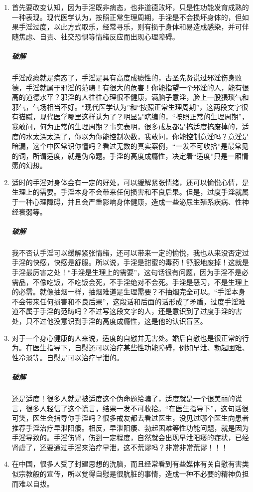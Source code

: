 \begin{enumerate}
    \item 首先要改变认知，因为手淫既非病态，也非道德败坏，只是性功能发育成熟的一种表现。现代医学认为，按照正常生理周期，手淫是不会损坏身体的，但如果手淫过度，以此方式取乐，经常寻乐，则有损于身体和易造成感染，并可伴随焦虑、自责、社交恐惧等情绪反应而出现心理障碍。
    \subparagraph{破解} 手淫成瘾就是病态了，手淫是具有高度成瘾性的，古圣先贤说过邪淫伤身败德，手淫就属于邪淫的范畴！有很大的危害！你能指望一个邪淫的人，能有很高的道德水平？邪淫的人往往心理很不健康，满脑子意淫，脸上一股猥琐气和邪气，气场相当不好。“现代医学认为”和“按照正常生理周期”，这两段文字很有猫腻，现代医学哪里这样认为了？明显是瞎编的，“按照正常的生理周期”，我敢问，何为正常的生理周期？事实表明，很多戒友都是搞适度搞废掉的，适度的水太深太深了，你以为你能控制次数，我敢问，你能控制意淫吗？意淫是暗漏，这个中医常识你懂吗？看过无数的真实案例，“一发不可收拾”是最常见的词，所谓适度，就是伪命题。手淫的高度成瘾性，决定着“适度”只是一厢情愿的幻想。
    \item 适时的手淫对身体会有一定的好处，可以缓解紧张情绪，还可以愉悦心情，是生理上的需要。手淫本身不会带来任何损害和不良后果。但是，过度手淫就属于一种心理障碍，并且会严重影响身体健康，造成一些泌尿生殖系疾病、性神经衰弱等。
    \subparagraph{破解} 我不否认手淫可以缓解紧张情绪，还可以带来一定的愉悦，我也从来没否定过手淫的快感，快感是舒服。所以说，手淫是甜蜜的毒药！舒服地废掉！这就是手淫最厉害之处！“手淫是生理上的需要”，这句话很有问题，因为手淫不是必需品，不像吃饭，不吃饭会死，不手淫绝对不会死。手淫是恶习，不是生理上的必需。就像抽烟一样，抽烟难道是生理需要？不抽烟完全可以。“手淫本身不会带来任何损害和不良后果”，这段话和后面的话形成了矛盾，过度手淫难道不属于手淫的范畴吗？不过写这段文字的人，还是意识到了过度手淫的害处，只不过他没意识到手淫的高度成瘾性，这是他的认识盲区。
    \item 对于一个身心健康的人来说，适度的自慰并无害处。婚后自慰也是很正常的行为。在医生指导下，自慰还可以治疗某些性功能障碍，例如早泄、勃起困难、性冷淡等。自慰是可以治疗早泄的。
    \subparagraph{破解} 还是适度！很多人就是被适度这个伪命题给骗了，适度就是一个很美丽的谎言，很多人轻信了这个谎言，结果一发不可收拾。“在医生指导下”，这句话很可笑，医生会指导你手淫吗？很多戒友都去看过医生，没见过哪个医生向患者推荐手淫治疗早泄阳痿。相反，早泄阳痿、勃起困难等性功能问题，就是因为手淫导致的。手淫伤肾，伤到一定程度，自然就会出现早泄阳痿的症状，已经肾虚了，还要通过手淫来治疗早泄，这不荒谬吗？非常非常荒谬！！！
    \item 在中国，很多人受了封建思想的洗脑，而且经常看到有些媒体有关自慰有害类似宗教般的宣传，所以觉得自慰是很肮脏的事情，造成一种不必要的精神负担而难以自拔。

\end{enumerate}
